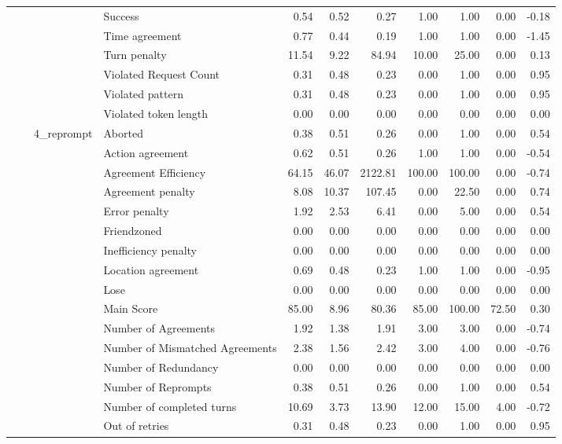 \begin{tabular}{llllrrrrrrr}
 &  &  & Success & 0.54 & 0.52 & 0.27 & 1.00 & 1.00 & 0.00 & -0.18 \\
 &  &  & Time agreement & 0.77 & 0.44 & 0.19 & 1.00 & 1.00 & 0.00 & -1.45 \\
 &  &  & Turn penalty & 11.54 & 9.22 & 84.94 & 10.00 & 25.00 & 0.00 & 0.13 \\
 &  &  & Violated Request Count & 0.31 & 0.48 & 0.23 & 0.00 & 1.00 & 0.00 & 0.95 \\
 &  &  & Violated pattern & 0.31 & 0.48 & 0.23 & 0.00 & 1.00 & 0.00 & 0.95 \\
 &  &  & Violated token length & 0.00 & 0.00 & 0.00 & 0.00 & 0.00 & 0.00 & 0.00 \\
\cline{3-11}
 &  & \multirow[t]{27}{*}{4_reprompt} & Aborted & 0.38 & 0.51 & 0.26 & 0.00 & 1.00 & 0.00 & 0.54 \\
 &  &  & Action agreement & 0.62 & 0.51 & 0.26 & 1.00 & 1.00 & 0.00 & -0.54 \\
 &  &  & Agreement Efficiency & 64.15 & 46.07 & 2122.81 & 100.00 & 100.00 & 0.00 & -0.74 \\
 &  &  & Agreement penalty & 8.08 & 10.37 & 107.45 & 0.00 & 22.50 & 0.00 & 0.74 \\
 &  &  & Error penalty & 1.92 & 2.53 & 6.41 & 0.00 & 5.00 & 0.00 & 0.54 \\
 &  &  & Friendzoned & 0.00 & 0.00 & 0.00 & 0.00 & 0.00 & 0.00 & 0.00 \\
 &  &  & Inefficiency penalty & 0.00 & 0.00 & 0.00 & 0.00 & 0.00 & 0.00 & 0.00 \\
 &  &  & Location agreement & 0.69 & 0.48 & 0.23 & 1.00 & 1.00 & 0.00 & -0.95 \\
 &  &  & Lose & 0.00 & 0.00 & 0.00 & 0.00 & 0.00 & 0.00 & 0.00 \\
 &  &  & Main Score & 85.00 & 8.96 & 80.36 & 85.00 & 100.00 & 72.50 & 0.30 \\
 &  &  & Number of Agreements & 1.92 & 1.38 & 1.91 & 3.00 & 3.00 & 0.00 & -0.74 \\
 &  &  & Number of Mismatched Agreements & 2.38 & 1.56 & 2.42 & 3.00 & 4.00 & 0.00 & -0.76 \\
 &  &  & Number of Redundancy & 0.00 & 0.00 & 0.00 & 0.00 & 0.00 & 0.00 & 0.00 \\
 &  &  & Number of Reprompts & 0.38 & 0.51 & 0.26 & 0.00 & 1.00 & 0.00 & 0.54 \\
 &  &  & Number of completed turns & 10.69 & 3.73 & 13.90 & 12.00 & 15.00 & 4.00 & -0.72 \\
 &  &  & Out of retries & 0.31 & 0.48 & 0.23 & 0.00 & 1.00 & 0.00 & 0.95 \\

\end{tabular}
